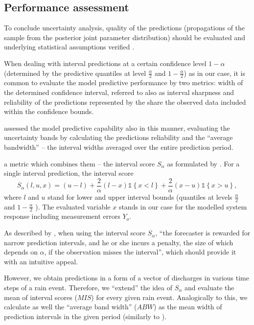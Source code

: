 \documentclass{ctuthesis}\usepackage[]{graphicx}\usepackage[]{color}
\begin{document}
\subsection{Performance assessment} \label{PerAsses}
To conclude uncertainty analysis, quality of the predictions (propagations of the sample from the posterior joint parameter distribution) should be evaluated and underlying statistical assumptions verified \citep{giudice2013improving}. 

When dealing with interval predictions at a certain confidence level $1-\alpha$ (determined by the predictive quantiles at level $ \frac{\alpha}{2} $ and $ 1-\frac{\alpha}{2} $) as in our case, it is common to evaluate the model predictive performance by two metrics: width of the determined confidence interval, referred to also as interval sharpness \mbox{\citep[e.g.][]{breinholt2012formal}} and reliability of the predictions represented by the share the observed data included within the confidence bounds.

\cite{giudice2013improving} assessed the model predictive capability also in this manner, evaluating the uncertainty bands  by calculating the predictions reliability and the \enquote{average bandwidth} --  the interval widths averaged over the entire prediction period.

 a metric which combines them -- the interval score $S_\alpha$ as formulated by \cite{gneiting2007strictly}. For a single interval prediction, the interval score 
\begin{equation}
S_\alpha(l,u,x) =  ( u - l ) + \frac{2}{\alpha} (l - x)  \mathds{1} \left\{x < l \right\} + \frac{2}{\alpha} (x - u)  \mathds{1} \left\{x > u \right\} ,
\end{equation}
where $l$ and $u$ stand for lower and upper interval bounds (quantiles at levels $ \frac{\alpha}{2} $ and $ 1-\frac{\alpha}{2} $ ). The evaluated variable $x$ stands in our case for the modelled system response including measurement errors $Y_o$. 

As described by \cite{gneiting2007strictly}, when using the interval score $S_\alpha$, \enquote{the forecaster is rewarded for narrow prediction intervals, and he or she incurs a penalty, the size of which depends on $\alpha$, if the observation misses the interval}, which should provide it with an intuitive appeal.

However, we obtain predictions in a form of a vector of discharges in various time steps of a rain event. Therefore, we \enquote{extend} the idea of  $S_\alpha$ and evaluate the mean of interval scores ($M\!I\!S$) for every given   rain event. Analogically to this, we calculate as well the \enquote{average band width} ($A\!B\!W$) as the mean width of prediction intervals in the given period (similarly to \cite{giudice2013improving}).
\end{document}
